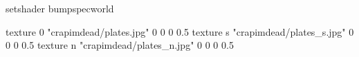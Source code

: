setshader bumpspecworld

texture 0 "crapimdead/plates.jpg" 0 0 0 0.5
texture s "crapimdead/plates_s.jpg" 0 0 0 0.5
texture n "crapimdead/plates_n.jpg" 0 0 0 0.5